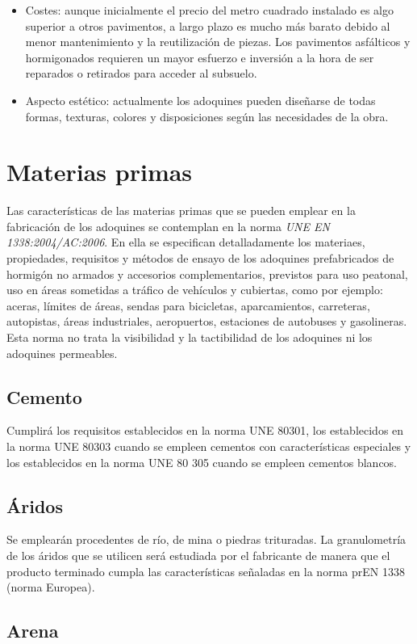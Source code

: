 \begin{itemize}
\item Costes: aunque inicialmente el precio del metro cuadrado instalado es algo superior a otros pavimentos, a largo plazo es mucho más barato debido al menor mantenimiento y la reutilización de piezas. Los pavimentos asfálticos y hormigonados requieren un mayor esfuerzo e inversión a la hora de ser reparados o retirados para acceder al subsuelo.

\item Aspecto estético: actualmente los adoquines pueden diseñarse de todas formas, texturas, colores y disposiciones según las necesidades de la obra.
\end{itemize}

\section{Materias primas}
Las características de las materias primas que se pueden emplear en la fabricación de los adoquines se contemplan en la norma \emph{UNE EN 1338:2004/AC:2006}. En ella se especifican detalladamente los materiaes, propiedades, requisitos y métodos de ensayo de los adoquines prefabricados de hormigón no armados y accesorios complementarios, previstos para uso peatonal, uso en áreas sometidas a tráfico de vehículos y cubiertas, como por ejemplo: aceras, límites de áreas, sendas para bicicletas, aparcamientos, carreteras, autopistas, áreas industriales, aeropuertos, estaciones de autobuses y gasolineras. Esta norma no trata la visibilidad y la tactibilidad de los adoquines ni los adoquines permeables.

\subsection{Cemento}
Cumplirá los requisitos establecidos en la norma UNE 80301, los establecidos en la norma UNE 80303 cuando se empleen cementos con características especiales y los establecidos en la norma UNE 80 305 cuando se empleen cementos blancos.

\subsection{Áridos}
Se emplearán procedentes de río, de mina o piedras trituradas. La granulometría de los áridos que se utilicen será estudiada por el fabricante de manera que el producto terminado cumpla las características señaladas en la norma prEN 1338 (norma Europea).

\subsection{Arena}


